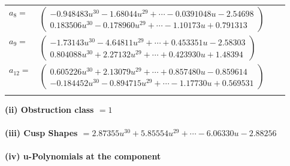 \documentclass[1p]{elsarticle_modified}
\theoremstyle{definition}
\begin{document}
\begin{tabular}{m{7pt} m{180pt} m{7pt} m{180pt} }
\flushright $a_{8}=$&$\begin{pmatrix}-0.948483 u^{30}-1.68044 u^{29}+\cdots-0.0391048 u-2.54698\\0.183506 u^{30}-0.178960 u^{29}+\cdots-1.10173 u+0.791313\end{pmatrix}$ \\
\flushright $a_{9}=$&$\begin{pmatrix}-1.73143 u^{30}-4.64811 u^{29}+\cdots+0.453351 u-2.58303\\0.804088 u^{30}+2.27132 u^{29}+\cdots+0.423930 u+1.48394\end{pmatrix}$ \\
\flushright $a_{12}=$&$\begin{pmatrix}0.605226 u^{30}+2.13079 u^{29}+\cdots+0.857480 u-0.859614\\-0.184452 u^{30}-0.894715 u^{29}+\cdots-1.17730 u+0.569531\end{pmatrix}$\\&\end{tabular}
\flushleft \textbf{(ii) Obstruction class $= 1$}\\~\\
\flushleft \textbf{(iii) Cusp Shapes $= 2.87355 u^{30}+5.85554 u^{29}+\cdots-6.06330 u-2.88256$}\\~\\
\newpage\renewcommand{\arraystretch}{1}
\flushleft \textbf{(iv) u-Polynomials at the component}\newline \\
\end{document}
